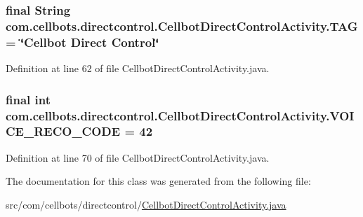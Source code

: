 \hypertarget{classcom_1_1cellbots_1_1directcontrol_1_1_cellbot_direct_control_activity_a6992276f903a32207161d88ddb246ee5}{
\subsubsection[{T\-A\-G}]{\setlength{\rightskip}{0pt plus 5cm}final String {\bf com.\-cellbots.\-directcontrol.\-Cellbot\-Direct\-Control\-Activity.\-T\-A\-G} = \char`\"{}Cellbot Direct Control\char`\"{}}}\label{classcom_1_1cellbots_1_1directcontrol_1_1_cellbot_direct_control_activity_a6992276f903a32207161d88ddb246ee5}


Definition at line 62 of file Cellbot\-Direct\-Control\-Activity.\-java.

\hypertarget{classcom_1_1cellbots_1_1directcontrol_1_1_cellbot_direct_control_activity_aeb0921f8654a5567dcbab2e5d15c3893}{
\subsubsection[{V\-O\-I\-C\-E\-\_\-\-R\-E\-C\-O\-\_\-\-C\-O\-D\-E}]{\setlength{\rightskip}{0pt plus 5cm}final int {\bf com.\-cellbots.\-directcontrol.\-Cellbot\-Direct\-Control\-Activity.\-V\-O\-I\-C\-E\-\_\-\-R\-E\-C\-O\-\_\-\-C\-O\-D\-E} = 42}}\label{classcom_1_1cellbots_1_1directcontrol_1_1_cellbot_direct_control_activity_aeb0921f8654a5567dcbab2e5d15c3893}


Definition at line 70 of file Cellbot\-Direct\-Control\-Activity.\-java.



The documentation for this class was generated from the following file\-:\begin{DoxyCompactItemize}
\item 
src/com/cellbots/directcontrol/\hyperlink{_cellbot_direct_control_activity_8java}{Cellbot\-Direct\-Control\-Activity.\-java}\end{DoxyCompactItemize}
